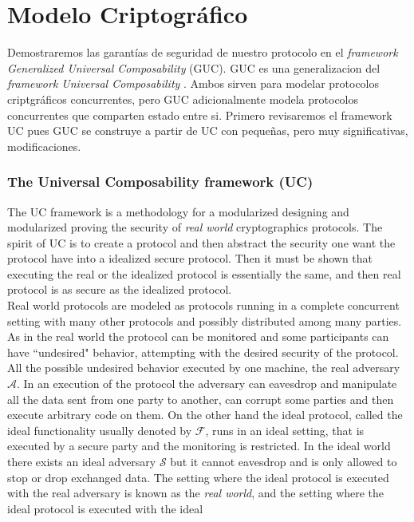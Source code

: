 \chapter{Modelo Criptográfico}

Demostraremos las garantías de seguridad de nuestro protocolo en el
\textit{framework Generalized Universal Composability} (GUC). GUC \cite{conf/tcc/CanettiDPW07}
es una generalizacion del \textit{framework Universal Composability}
\cite{conf/focs/Canetti01}. Ambos sirven para modelar protocolos criptgráficos concurrentes,
pero GUC adicionalmente modela protocolos concurrentes que comparten estado entre si.
Primero revisaremos el framework UC pues GUC se construye a partir de UC con pequeñas,
pero muy significativas, modificaciones.\\

\subsection{The Universal Composability framework (UC)}
The UC framework is a methodology for a modularized designing and modularized proving the security of
\textit{real world} cryptographics protocols. The spirit of UC is to create a protocol and then abstract the
security one  want the protocol have into a idealized secure protocol. Then it must be shown that
executing the real or the idealized protocol is essentially the same, and then real protocol is as
secure as the idealized protocol.\\
Real world protocols are modeled as protocols running in a complete concurrent setting with many other protocols and
possibly distributed among many parties. As in the real world the protocol can be monitored and some participants
can have ``undesired" behavior, attempting with the desired security of the protocol. All the possible undesired behavior
executed by one machine, the real adversary $\mathcal{A}$. In an execution of the protocol the adversary can eavesdrop and
manipulate all the data sent from one  party to another, can corrupt some parties and then execute
arbitrary code on them. On the other hand the ideal protocol, called the ideal functionality usually denoted by
$\mathcal{F}$, runs in an ideal setting,
that is executed by a secure party and the monitoring is restricted. In the ideal world there exists an ideal adversary
$\mathcal{S}$ but it cannot
eavesdrop and is only allowed to stop or drop exchanged data. The setting where the ideal protocol is executed with the
real adversary is known as the \textit{real world}, and the setting where the ideal protocol is executed with the ideal
